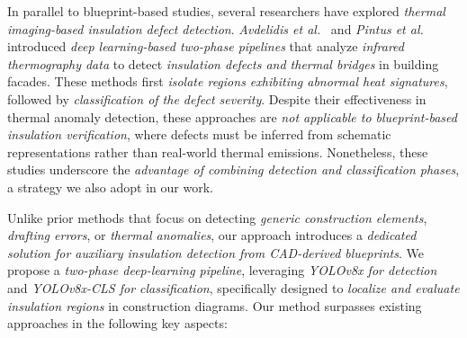 In parallel to blueprint-based studies, several researchers have explored \textit{thermal imaging-based insulation defect detection}. \textit{Avdelidis et al.}~\cite{avdelidis2019infrared} and \textit{Pintus et al.}~\cite{pintus2021deep} introduced \textit{deep learning-based two-phase pipelines} that analyze \textit{infrared thermography data} to detect \textit{insulation defects and thermal bridges} in building facades. These methods first \textit{isolate regions exhibiting abnormal heat signatures}, followed by \textit{classification of the defect severity}. Despite their effectiveness in thermal anomaly detection, these approaches are \textit{not applicable to blueprint-based insulation verification}, where defects must be inferred from schematic representations rather than real-world thermal emissions. Nonetheless, these studies underscore the \textit{advantage of combining detection and classification phases}, a strategy we also adopt in our work.  

Unlike prior methods that focus on detecting \textit{generic construction elements}, \textit{drafting errors}, or \textit{thermal anomalies}, our approach introduces a \textit{dedicated solution for auxiliary insulation detection from CAD-derived blueprints}. We propose a \textit{two-phase deep-learning pipeline}, leveraging \textit{YOLOv8x for detection} and \textit{YOLOv8x-CLS for classification}, specifically designed to \textit{localize and evaluate insulation regions} in construction diagrams. Our method surpasses existing approaches in the following key aspects:  

